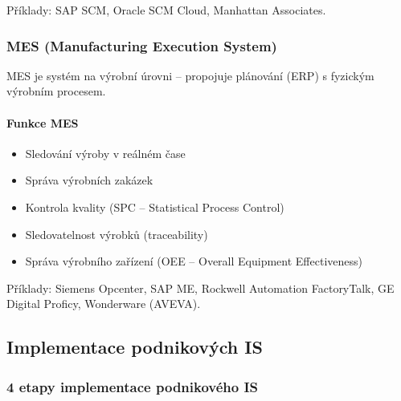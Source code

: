 Příklady: SAP SCM, Oracle SCM Cloud, Manhattan Associates.

\subsubsection{MES (Manufacturing Execution System)}

MES je systém na výrobní úrovni -- propojuje plánování (ERP) s fyzickým výrobním procesem.

\paragraph{Funkce MES}
\begin{itemize}
  \item Sledování výroby v reálném čase
  \item Správa výrobních zakázek
  \item Kontrola kvality (SPC -- Statistical Process Control)
  \item Sledovatelnost výrobků (traceability)
  \item Správa výrobního zařízení (OEE -- Overall Equipment Effectiveness)
\end{itemize}

Příklady: Siemens Opcenter, SAP ME, Rockwell Automation FactoryTalk, GE Digital Proficy, Wonderware (AVEVA).

\subsection{Implementace podnikových IS}

\subsubsection{4 etapy implementace podnikového IS}

